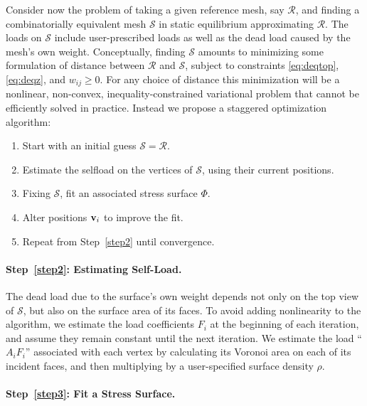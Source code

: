 \documentclass[review]{acmsiggraph}
\def\SS{{\mathcal S}}
\def\RR{{\mathcal R}}
\begin{document}
Consider now the problem of taking a given reference mesh, say $\RR$, and 
finding a combinatorially equivalent mesh $\SS$ in static equilibrium 
approximating $\RR$. The loads on $\SS$ include user-prescribed loads as 
well as the dead load caused by the mesh's own weight. Conceptually, 
finding $\SS$ amounts to minimizing some formulation of distance between 
$\RR$ and $\SS$, subject to constraints \eqref{eq:deqtop}, 
\eqref{eq:deqz}, and $w_{ij} \geq 0$. For any choice of distance this 
minimization will be a nonlinear, non-convex, inequality-constrained 
variational problem that cannot be efficiently solved in practice. Instead 
we propose a staggered optimization algorithm:

\begin{enumerate}\itemsep-\parsep\setcounter{enumi}{-1}

\item Start with an initial guess $\SS = \RR$.

\item \label{step2} Estimate the self\dash load on the vertices of $\SS$, 
using their current positions.

\item \label{step3} Fixing $\SS$, fit an associated stress surface $\Phi$.

\item \label{step4} Alter positions ${\mathbf v}_i$ to improve the fit.

\item Repeat from Step~\ref{step2} until convergence.

\end{enumerate}

\paragraph{Step~\ref{step2}: Estimating Self-Load.}

The dead load due to the surface's own weight depends not only on the top 
view of $\SS$, but also on the surface area of its faces. To avoid adding 
nonlinearity to the algorithm, we estimate the load coefficients $F_i$ at 
the beginning of each iteration, and assume they remain constant until the 
next iteration. We estimate the load ``$A_iF_i$'' associated with each 
vertex by calculating its Voronoi area on each of its incident faces, and 
then multiplying by a user-specified surface density $\rho$.

\paragraph{Step~\ref{step3}: Fit a Stress Surface.}
\end{document}
